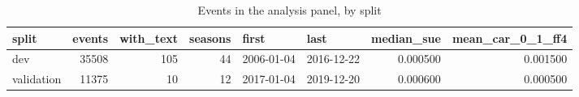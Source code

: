 \begin{table}
\caption{Events in the analysis panel, by split}
\label{tab:panel_by_split}
\begin{tabular}{lrrrllrr}
\toprule
split & events & with\_text & seasons & first & last & median\_sue & mean\_car\_0\_1\_ff4 \\
\midrule
dev & 35508 & 105 & 44 & 2006-01-04 & 2016-12-22 & 0.000500 & 0.001500 \\
validation & 11375 & 10 & 12 & 2017-01-04 & 2019-12-20 & 0.000600 & 0.000500 \\
\bottomrule
\end{tabular}
\end{table}
